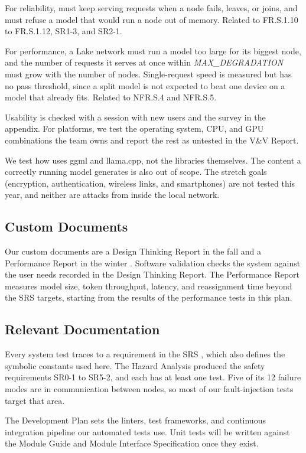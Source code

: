 \documentclass[12pt, titlepage]{article}
\begin{document}
For reliability, \progname{} must keep serving requests when a node fails,
leaves, or joins, and must refuse a model that would run a node out of memory.
Related to FR.S.1.10 to FR.S.1.12, SR1-3, and SR2-1.

For performance, a Lake network must run a model too large for its biggest
node, and the number of requests it serves at once within
\textit{MAX\_DEGRADATION} must grow with the number of nodes. Single-request
speed is measured but has no pass threshold, since a split model is not
expected to beat one device on a model that already fits. Related to NFR.S.4
and NFR.S.5.

Usability is checked with a session with new users and the survey in the
appendix. For platforms, we test the operating system, CPU, and GPU combinations
the team owns and report the rest as untested in the V\&V Report.

We test how \progname{} uses ggml and llama.cpp, not the libraries
themselves. The content a correctly running model generates is also out of
scope. The stretch goals (encryption,
authentication, wireless links, and smartphones) are not tested this year, and
neither are attacks from inside the local network.

\subsection{Custom Documents}

Our custom documents are a Design Thinking Report in the fall and a Performance
Report in the winter \citep{ProblemStatement}. Software validation checks the
system against the user needs recorded in the Design Thinking Report. The
Performance Report measures model size, token throughput, latency, and
reassignment time beyond the SRS targets, starting from the results of the
performance tests in this plan.

\subsection{Relevant Documentation}

Every system test traces to a requirement in the SRS \citep{SRS}, which also
defines the symbolic constants used here. The Hazard Analysis
\citep{HazardAnalysis} produced the safety requirements SR0-1 to SR5-2, and
each has at least one test. Five of its 12 failure modes are in communication
between nodes, so most of our fault-injection tests target that
area.

The Development Plan \citep{DevelopmentPlan} sets the linters, test frameworks,
and continuous integration pipeline our automated tests use. Unit tests will be written against the
Module Guide \citep{MG} and Module Interface Specification \citep{MIS} once
they exist.
\end{document}

